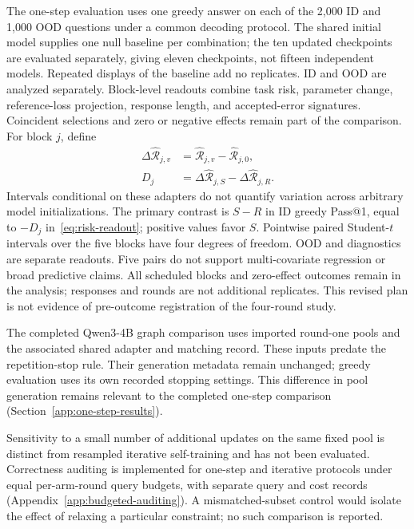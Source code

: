 The one-step evaluation uses one greedy answer on each of the 2,000 ID and
1,000 OOD questions under a common decoding protocol. The shared initial
model supplies one null baseline per combination; the ten updated checkpoints
are evaluated separately, giving eleven checkpoints, not fifteen independent
models. Repeated displays of the baseline add no replicates. ID and OOD
are analyzed separately. Block-level
readouts combine task risk, parameter change, reference-loss projection,
response length, and accepted-error signatures. Coincident selections and
zero or negative effects remain part of the comparison.
For block $j$, define
\begin{equation}
 \begin{aligned}
 \Delta\widehat{\mathcal R}_{j,v}
 &=\widehat{\mathcal R}_{j,v}-\widehat{\mathcal R}_{j,0},\\
 D_j&=\Delta\widehat{\mathcal R}_{j,S}
       -\Delta\widehat{\mathcal R}_{j,R}.
 \end{aligned}
 \label{eq:risk-readout}
\end{equation}
Intervals conditional on these adapters do not quantify variation across
arbitrary model initializations. The primary contrast is $S-R$ in
ID greedy Pass@1, equal to $-D_j$ in~\eqref{eq:risk-readout}; positive values
favor $S$. Pointwise paired Student-$t$ intervals over the five blocks have
four degrees of freedom. OOD and diagnostics are separate readouts. Five
pairs do not support multi-covariate regression or broad predictive claims.
All scheduled blocks and zero-effect outcomes remain in the analysis;
responses and rounds are not additional replicates. This revised plan is
not evidence of pre-outcome registration of the four-round study.

The completed Qwen3-4B graph comparison uses imported round-one pools and the
associated shared adapter and matching record. These inputs predate the
repetition-stop rule.
Their generation metadata remain unchanged; greedy evaluation uses its own
recorded stopping settings. This difference in pool generation remains relevant
to the completed one-step comparison (Section~\ref{app:one-step-results}).

Sensitivity to a small number of additional updates on the same fixed pool
is distinct from resampled iterative self-training and has not been evaluated.
Correctness auditing is implemented for one-step and iterative protocols
under equal per-arm-round query budgets, with separate query and
cost records (Appendix~\ref{app:budgeted-auditing}). A mismatched-subset
control would isolate the effect of relaxing a particular constraint;
no such comparison is reported.

